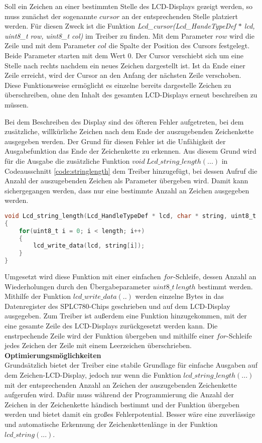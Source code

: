 Soll ein Zeichen an einer bestimmten Stelle des LCD-Displays gezeigt werden, so muss zunächst der sogenannte $cursor$ an der entsprechenden Stelle platziert werden. Für diesen Zweck ist die Funktion \textit{Lcd\_cursor(Lcd\_HandeTypeDef $*$ lcd, uint8\_t row, uint8\_t col)} im Treiber zu finden. Mit dem Parameter $row$ wird die Zeile und mit dem Parameter $col$ die Spalte der Position des Cursors festgelegt. Beide Parameter starten mit dem Wert 0. Der Cursor verschiebt sich um eine Stelle nach rechts nachdem ein neues Zeichen dargestellt ist. Ist da Ende einer Zeile erreicht, wird der Cursor an den Anfang der nächsten Zeile verschoben. Diese Funktionsweise ermöglicht es einzelne bereits dargestelle Zeichen zu überschreiben, ohne den Inhalt des gesamten LCD-Displays erneut beschreiben zu müssen.

Bei dem Beschreiben des Display sind des öfteren Fehler aufgetreten, bei dem zusätzliche, willkürliche Zeichen nach dem Ende der auszugebenden Zeichenkette ausgegeben werden. Der Grund für diesen Fehler ist die Unfähigkeit der Ausgabefunktion das Ende der Zeichenkette zu erkennen. Aus diesem Grund wird für die Ausgabe die zusätzliche Funktion $void\ Lcd\_string\_length(...)$ in Codeausschnitt \ref{code:stringlength} dem Treiber hinzugefügt, bei dessen Aufruf die Anzahl der auszugebenden Zeichen als Parameter übergeben wird. Damit kann sichergegangen werden, dass nur eine bestimmte Anzahl an Zeichen ausgegeben werden.
\begin{lstlisting}[firstnumber=95, language=C, caption = lcd.c: Funktion Lcd\_string\_length(...), label = code:stringlength]
void Lcd_string_length(Lcd_HandleTypeDef * lcd, char * string, uint8_t length)
{
	for(uint8_t i = 0; i < length; i++)
	{
		lcd_write_data(lcd, string[i]);
	}
}
\end{lstlisting}
Umgesetzt wird diese Funktion mit einer einfachen $for$-Schleife, dessen Anzahl an Wiederholungen durch den Übergabeparameter $uint8\_t\ length$ bestimmt werden. Mithilfe der Funktion $lcd\_write\_data(..)$ werden einzelne Bytes in das Datenregister des SPLC780-Chips geschrieben und auf dem LCD-Display ausgegeben.
Zum Treiber ist außerdem eine Funktion hinzugekommen, mit der eine gesamte Zeile des LCD-Displays zurückgesetzt werden kann. Die enstrpechende Zeile wird der Funktion übergeben und mithilfe einer $for$-Schleife jedes Zeichen der Zeile mit einem Leerzeichen überschrieben.\\
\textbf{Optimierungsmöglichkeiten}\\
Grundsätzlich bietet der Treiber eine stabile Grundlage für einfache Ausgaben auf dem Zeichen-LCD-Display, jedoch nur wenn die Funktion $lcd\_string\_length(...)$ mit der entsprechenden Anzahl an Zeichen der auszugebenden Zeichenkette aufgerufen wird. Dafür muss während der Programmierung die Anzahl der Zeichen in der Zeichenkette händisch bestimmt und der Funktion übergeben werden und bietet damit ein großes Fehlerpotential. Besser wäre eine zuverlässige und automatische Erkennung der Zeichenkettenlänge in der Funktion $lcd\_string(...)$.